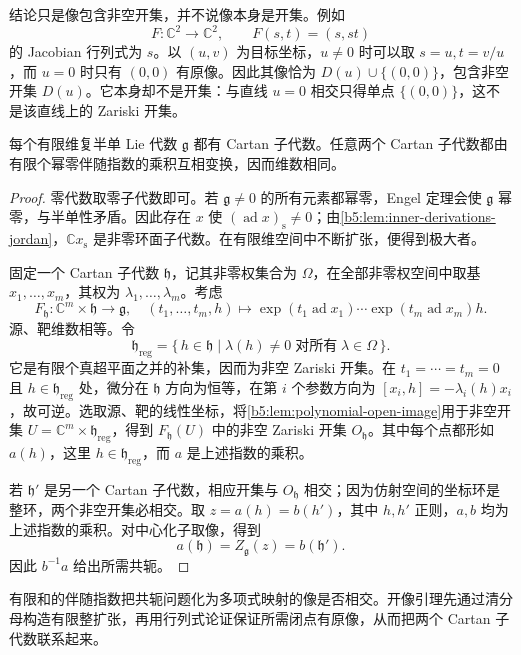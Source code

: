 结论只是像包含非空开集，并不说像本身是开集。例如
\[
	F:\mathbb C^2\to\mathbb C^2,\qquad F(s,t)=(s,st)
\]
的 Jacobian 行列式为 \(s\)。以 \((u,v)\) 为目标坐标，\(u\ne0\) 时可以取 \(s=u,t=v/u\)，而 \(u=0\) 时只有 \((0,0)\) 有原像。因此其像恰为 \(D(u)\cup\{(0,0)\}\)，包含非空开集 \(D(u)\)。它本身却不是开集：与直线 \(u=0\) 相交只得单点 \(\{(0,0)\}\)，这不是该直线上的 Zariski 开集。

\begin{theorem}\label{b5:thm:cartan-conjugacy}
	每个有限维复半单 Lie 代数 \(\mathfrak g\) 都有 Cartan 子代数。任意两个 Cartan 子代数都由有限个幂零伴随指数的乘积互相变换，因而维数相同。
\end{theorem}
\begin{proof}
	零代数取零子代数即可。若 \(\mathfrak g\ne0\) 的所有元素都幂零，Engel 定理会使 \(\mathfrak g\) 幂零，与半单性矛盾。因此存在 \(x\) 使 \((\operatorname{ad}x)_{\mathrm s}\ne0\)；由\cref{b5:lem:inner-derivations-jordan}，\(\mathbb Cx_{\mathrm s}\) 是非零环面子代数。在有限维空间中不断扩张，便得到极大者。

	固定一个 Cartan 子代数 \(\mathfrak h\)，记其非零权集合为 \(\Omega\)，在全部非零权空间中取基 \(x_1,\ldots,x_m\)，其权为 \(\lambda_1,\ldots,\lambda_m\)。考虑
	\[
		F_{\mathfrak h}:\mathbb C^m\times\mathfrak h\longrightarrow\mathfrak g, \quad (t_1,\ldots,t_m,h)\longmapsto \exp(t_1\operatorname{ad}x_1)\cdots \exp(t_m\operatorname{ad}x_m)h.
	\]
	源、靶维数相等。令
	\[
		\mathfrak h_{\mathrm{reg}} =\bigl\{\,h\in\mathfrak h\mid \lambda(h)\ne0\;\text{对所有}\;\lambda\in\Omega\,\bigr\}.
	\]
	它是有限个真超平面之并的补集，因而为非空 Zariski 开集。在 \(t_1=\cdots=t_m=0\) 且 \(h\in\mathfrak h_{\mathrm{reg}}\) 处，微分在 \(\mathfrak h\) 方向为恒等，在第 \(i\) 个参数方向为 \([x_i,h]=-\lambda_i(h)x_i\)，故可逆。选取源、靶的线性坐标，将\cref{b5:lem:polynomial-open-image}用于非空开集 \(U=\mathbb C^m\times\mathfrak h_{\mathrm{reg}}\)，得到 \(F_{\mathfrak h}(U)\) 中的非空 Zariski 开集 \(O_{\mathfrak h}\)。其中每个点都形如 \(a(h)\)，这里 \(h\in\mathfrak h_{\mathrm{reg}}\)，而 \(a\) 是上述指数的乘积。

	若 \(\mathfrak h'\) 是另一个 Cartan 子代数，相应开集与 \(O_{\mathfrak h}\) 相交；因为仿射空间的坐标环是整环，两个非空开集必相交。取 \(z=a(h)=b(h')\)，其中 \(h,h'\) 正则，\(a,b\) 均为上述指数的乘积。对中心化子取像，得到
	\[
		a(\mathfrak h)=Z_{\mathfrak g}(z)=b(\mathfrak h').
	\]
	因此 \(b^{-1}a\) 给出所需共轭。
\end{proof}

有限和的伴随指数把共轭问题化为多项式映射的像是否相交。开像引理先通过清分母构造有限整扩张，再用行列式论证保证所需闭点有原像，从而把两个 Cartan 子代数联系起来。


